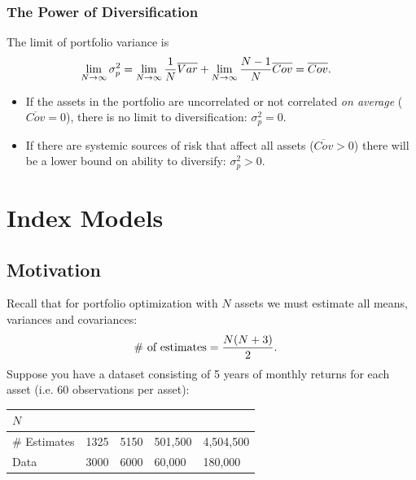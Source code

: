 \documentclass[letterpaper,10pt,english]{sphinxmanual}
\begin{document}
\subsection{The Power of Diversification}
\label{multiAssetOpt:id11}
The limit of portfolio variance is
\begin{gather}
\begin{split}\lim_{N \to \infty} \sigma^2_p & = \lim_{N \to \infty} \frac{1}{N}
\overline{Var} + \lim_{N \to \infty} \frac{N-1}{N}
\overline{Cov} = \overline{Cov}.\end{split}\notag
\end{gather}\begin{itemize}
\item {} 
If the assets in the portfolio are uncorrelated or not correlated
\emph{on average} ($\overline{Cov} = 0$), there is no limit to
diversification: $\sigma^2_p = 0$.

\end{itemize}
\begin{itemize}
\item {} 
If there are systemic sources of risk that affect all assets
($\overline{Cov} > 0$) there will be a lower bound on ability
to diversify: $\sigma^2_p > 0$.

\end{itemize}


\chapter{Index Models}
\label{indexModels::doc}\label{indexModels:index-models}

\section{Motivation}
\label{indexModels:motivation}
Recall that for portfolio optimization with $N$ assets we must
estimate all means, variances and covariances:
\begin{gather}
\begin{split}\# \,\, \text{of estimates} & = \frac{N(N+3)}{2}.\end{split}\notag
\end{gather}
Suppose you have a dataset consisting of 5 years of monthly returns
for each asset (i.e. 60 observations per asset):

\begin{tabulary}{\linewidth}{|L|L|L|L|L|}
\hline
\textsf{\relax 
$N$
} & \textsf{
} & \textsf{
} & \textsf{
} & \textsf{
}\\
\hline
\# Estimates
 & 
1325
 & 
5150
 & 
501,500
 & 
4,504,500
\\

Data
 & 
3000
 & 
6000
 & 
60,000
 & 
180,000
\\
\hline\end{tabulary}
\end{document}
